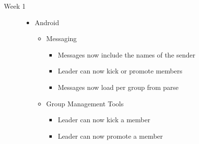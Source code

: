 \documentclass[11pt]{article}
\begin{document}
\begin{description}
	\item[Week 1] \hfill
	\begin{itemize}
		\item Android
		\begin{itemize}
			\item Messaging
			\begin{itemize}
				\item Messages now include the names of the sender
				\item Leader can now kick or promote members
				\item Messages now load per group from parse
			\end{itemize}
			\item Group Management Tools
			\begin{itemize}
				\item Leader can now kick a member
				\item Leader can now promote a member
			\end{itemize}
		\end{itemize}
	\end{itemize}
	

\end{description}
\end{document}
